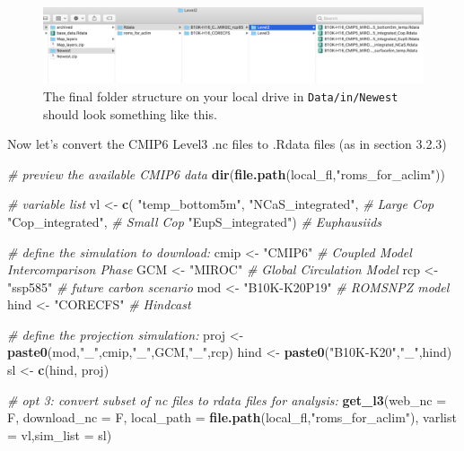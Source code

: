 \documentclass[
]{article}
\newenvironment{Shaded}{\begin{snugshade}}{\end{snugshade}}
\newcommand{\CommentTok}[1]{\textcolor[rgb]{0.56,0.35,0.01}{\textit{#1}}}
\newcommand{\DataTypeTok}[1]{\textcolor[rgb]{0.13,0.29,0.53}{#1}}
\newcommand{\KeywordTok}[1]{\textcolor[rgb]{0.13,0.29,0.53}{\textbf{#1}}}
\newcommand{\NormalTok}[1]{#1}
\newcommand{\StringTok}[1]{\textcolor[rgb]{0.31,0.60,0.02}{#1}}
\begin{document}
\begin{figure}
\centering
\includegraphics[width=1\textwidth,height=\textheight]{Figs/filestructure.jpg}
\caption{The final folder structure on your local drive in
\texttt{Data/in/Newest} should look something like this.}
\end{figure}

Now let's convert the CMIP6 Level3 .nc files to .Rdata files (as in
section 3.2.3)

\begin{Shaded}
\begin{Highlighting}[]
    \CommentTok{# preview the available CMIP6 data}
    \KeywordTok{dir}\NormalTok{(}\KeywordTok{file.path}\NormalTok{(local_fl,}\StringTok{"roms_for_aclim"}\NormalTok{))}
    
    \CommentTok{# variable list}
\NormalTok{    vl        <-}\StringTok{ }\KeywordTok{c}\NormalTok{(}
                  \StringTok{"temp_bottom5m"}\NormalTok{,}
                  \StringTok{"NCaS_integrated"}\NormalTok{, }\CommentTok{# Large Cop}
                  \StringTok{"Cop_integrated"}\NormalTok{,  }\CommentTok{# Small Cop}
                  \StringTok{"EupS_integrated"}\NormalTok{) }\CommentTok{# Euphausiids}

  \CommentTok{# define the simulation to download:}
\NormalTok{    cmip <-}\StringTok{ "CMIP6"}     \CommentTok{# Coupled Model Intercomparison Phase}
\NormalTok{    GCM  <-}\StringTok{ "MIROC"}     \CommentTok{# Global Circulation Model}
\NormalTok{    rcp  <-}\StringTok{ "ssp585"}     \CommentTok{# future carbon scenario}
\NormalTok{    mod  <-}\StringTok{ "B10K-K20P19"}  \CommentTok{# ROMSNPZ model}
\NormalTok{    hind <-}\StringTok{ "CORECFS"}      \CommentTok{# Hindcast}
    
    \CommentTok{# define the projection simulation:}
\NormalTok{    proj  <-}\StringTok{ }\KeywordTok{paste0}\NormalTok{(mod,}\StringTok{"_"}\NormalTok{,cmip,}\StringTok{"_"}\NormalTok{,GCM,}\StringTok{"_"}\NormalTok{,rcp)}
\NormalTok{    hind  <-}\StringTok{ }\KeywordTok{paste0}\NormalTok{(}\StringTok{"B10K-K20"}\NormalTok{,}\StringTok{"_"}\NormalTok{,hind)}
\NormalTok{    sl    <-}\StringTok{ }\KeywordTok{c}\NormalTok{(hind, proj)}
    
    \CommentTok{# opt 3:  convert subset of nc files to rdata files for analysis:}
    \KeywordTok{get_l3}\NormalTok{(}\DataTypeTok{web_nc =}\NormalTok{ F, }\DataTypeTok{download_nc =}\NormalTok{ F,}
          \DataTypeTok{local_path =} \KeywordTok{file.path}\NormalTok{(local_fl,}\StringTok{"roms_for_aclim"}\NormalTok{),}
          \DataTypeTok{varlist =}\NormalTok{ vl,}\DataTypeTok{sim_list =}\NormalTok{ sl)}
\end{Highlighting}
\end{Shaded}
\end{document}
